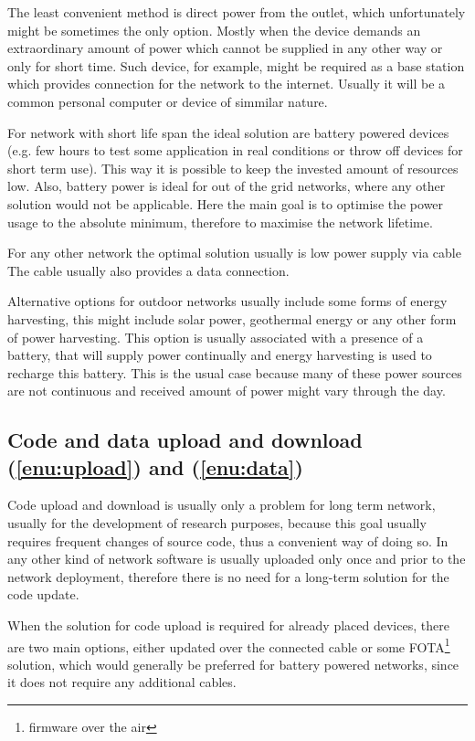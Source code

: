 \documentclass[
  print, %
  table,   %
  nolof,     %
  nolot,     %
           oneside
]{fithesis3}
\begin{document}
  The least convenient method is direct power from the outlet, which unfortunately might be sometimes the only option. Mostly when the device demands an extraordinary amount of power which cannot be supplied in any other way or only for short time. Such device, for example, might be required as a base station which provides connection for the network to the internet. Usually it will be a common personal computer or device of simmilar nature.

  For network with short life span the ideal solution are battery powered devices (e.g. few hours to test some application in real conditions or throw off devices for short term use). This way it is possible to keep the invested amount of resources low. Also, battery power is ideal for out of the grid networks, where any other solution would not be applicable. Here the main goal is to optimise the power usage to the absolute minimum, therefore to maximise the network lifetime.

  For any other network the optimal solution usually is low power supply via cable The cable usually also provides a data connection.

  Alternative options for outdoor networks usually include some forms of energy harvesting, this might include solar power, geothermal energy or any other form of power harvesting. This option is usually associated with a presence of a battery, that will supply power continually and energy harvesting is used to recharge this battery. This is the usual case because many of these power sources are not continuous and received amount of power might vary through the day.

  \subsection{Code and data upload and download (\ref{enu:upload}) and (\ref{enu:data})}
  Code upload and download is usually only a problem for long term network, usually for the development of research purposes, because this goal usually requires frequent changes of source code, thus a convenient way of doing so. In any other kind of network software is usually uploaded only once and prior to the network deployment, therefore there is no need for a long-term solution for the code update.

  When the solution for code upload is required for already placed devices, there are two main options, either updated over the connected cable or some FOTA\footnote{firmware over the air} solution, which would generally be preferred for battery powered networks, since it does not require any additional cables.
\end{document}

